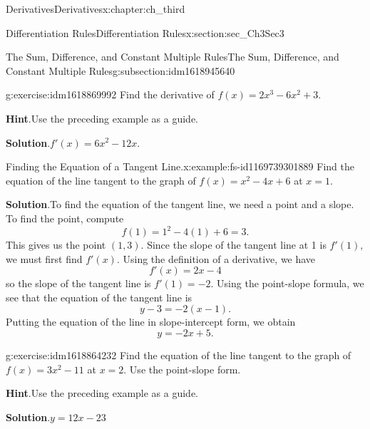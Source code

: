 \documentclass[oneside,10pt,]{book}
\newcommand{\blocktitlefont}{\relax}
\numberwithin{equation}{section}
\begin{document}
\begin{chapterptx}{Derivatives}{}{Derivatives}{}{}{x:chapter:ch_third}
\begin{sectionptx}{Differentiation Rules}{}{Differentiation Rules}{}{}{x:section:sec_Ch3Sec3}
\begin{subsectionptx}{The Sum, Difference, and Constant Multiple Rules}{}{The Sum, Difference, and Constant Multiple Rules}{}{}{g:subsection:idm1618945640}
\begin{inlineexercise}{}{g:exercise:idm1618869992}
Find the derivative of \(f(x)=2x^3-6x^2+3.\)%
\par\smallskip%
\noindent\textbf{\blocktitlefont Hint}.\hypertarget{g:hint:idm1618871272}{}\quad{}Use the preceding example as a guide.%
\par\smallskip%
\noindent\textbf{\blocktitlefont Solution}.\hypertarget{g:solution:idm1618866792}{}\quad{}\(f'(x)=6x^2-12x.\)%
\end{inlineexercise}%
\begin{example}{Finding the Equation of a Tangent Line.}{x:example:fs-id1169739301889}%
Find the equation of the line tangent to the graph of \(f(x)=x^2-4x+6\) at \(x=1.\)%
\par\smallskip%
\noindent\textbf{\blocktitlefont Solution}.\hypertarget{g:solution:idm1618867816}{}\quad{}To find the equation of the tangent line, we need a point and a slope. To find the point, compute%
%
\begin{equation*}
f(1)=1^2-4(1)+6=3.
\end{equation*}
This gives us the point \((1,3).\) Since the slope of the tangent line at 1 is \(f'(1),\) we must first find \(f'(x).\) Using the definition of a derivative, we have%
%
\begin{equation*}
f'(x)=2x-4
\end{equation*}
so the slope of the tangent line is \(f'(1)=-2.\) Using the point-slope formula, we see that the equation of the tangent line is%
%
\begin{equation*}
y-3=-2(x-1).
\end{equation*}
Putting the equation of the line in slope-intercept form, we obtain%
%
\begin{equation*}
y=-2x+5.
\end{equation*}
\end{example}
\begin{inlineexercise}{}{g:exercise:idm1618864232}%
Find the equation of the line tangent to the graph of \(f(x)=3x^2-11\) at \(x=2.\) Use the point-slope form.%
\par\smallskip%
\noindent\textbf{\blocktitlefont Hint}.\hypertarget{g:hint:idm1618856936}{}\quad{}Use the preceding example as a guide.%
\par\smallskip%
\noindent\textbf{\blocktitlefont Solution}.\hypertarget{g:solution:idm1618859496}{}\quad{}\(y=12x-23\)%
\end{inlineexercise}%
\end{subsectionptx}
%
%
\typeout{************************************************}

\end{sectionptx}
\end{chapterptx}
\end{document}
